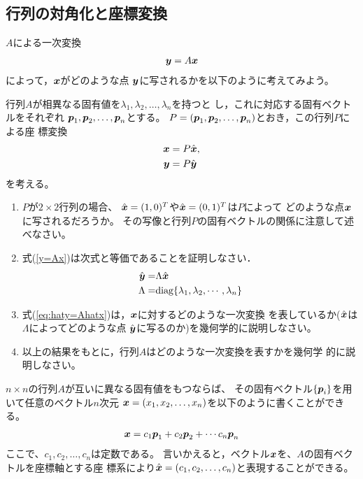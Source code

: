 \documentclass[twocolumn,11pt]{jarticle}
\begin{document}
\subsection{行列の対角化と座標変換}

$A$による一次変換
\begin{align}
  \label{y=Ax}
  \boldsymbol{y}=A\boldsymbol{x}
\end{align}
によって，$\boldsymbol{x}$がどのような点
$\boldsymbol{y}$に写されるかを以下のように考えてみよう。

行列$A$が相異なる固有値を$\lambda_1,\lambda_2,\ldots,\lambda_n$を持つと
し，これに対応する固有ベクトルをそれぞれ
$\boldsymbol{p}_1,\boldsymbol{p}_2,\ldots,\boldsymbol{p}_n$とする。
$P=(\boldsymbol{p}_1,\boldsymbol{p}_2,\ldots,\boldsymbol{p}_n)$とおき，この行列$P$による座
標変換
\begin{align}
\boldsymbol{x}&=P\hat{\boldsymbol{x}},\notag\\
\boldsymbol{y}&=P\hat{\boldsymbol{y}}\notag
\end{align}
を考える。

\nquestion
\begin{enumerate}
\item 
  $P$が$2\times 2$行列の場合、
  $\hat{\boldsymbol{x}}=(1,0)^T$や$\hat{\boldsymbol{x}}=(0,1)^T$は$P$によって
  どのような点$\boldsymbol{x}$に写されるだろうか。
  その写像と行列$P$の固有ベクトルの関係に注意して述べなさい。
\item 式(\ref{y=Ax})は次式と等価であることを証明しなさい．
  \begin{align}
    \label{eq:haty=Ahatx}
    \hat{\boldsymbol{y}}=&\Lambda\hat{\boldsymbol{x}}\\
    \Lambda=&\mbox{diag}\{\lambda_1,\lambda_2,\cdots,\lambda_n\}\notag
  \end{align}
\item 式(\ref{eq:haty=Ahatx})は，$\boldsymbol{x}$に対するどのような一次変換
  を表しているか($\hat{\boldsymbol{x}}$は$\Lambda$によってどのような点
  $\hat{\boldsymbol{y}}$に写るのか)を幾何学的に説明しなさい。
\item 以上の結果をもとに，行列$A$はどのような一次変換を表すかを幾何学
  的に説明しなさい。
\end{enumerate}

\nquestion
$n\times n$の行列$A$が互いに異なる固有値をもつならば、
その固有ベクトル$\{\boldsymbol{p}_i\}$を用いて任意のベクトル$n$次元
$\boldsymbol{x}=(x_1,x_2,\ldots,x_n)$を以下のように書くことができる。
\begin{align}
    \boldsymbol{x}=c_1\boldsymbol{p}_1+c_2\boldsymbol{p}_2+\cdots c_n\boldsymbol{p}_n
\end{align}
ここで、$c_1,c_2,\ldots,c_n$は定数である。
言いかえると，ベクトル$\boldsymbol{x}$を、$A$の固有ベクトルを座標軸とする座
標系により$\hat{\boldsymbol{x}}=(c_1,c_2,\ldots,c_n)$と表現することができる。
\end{document}
